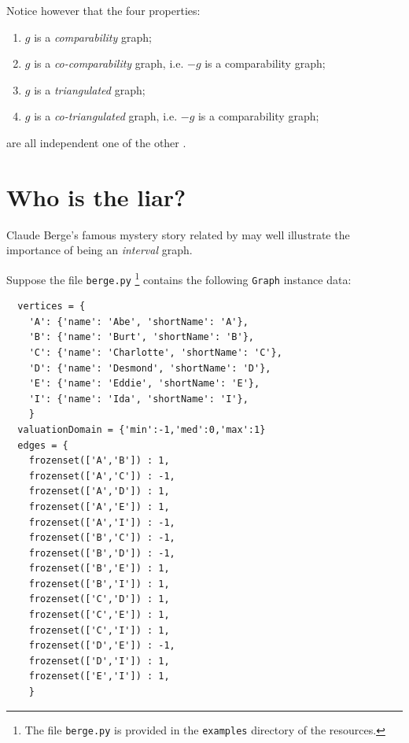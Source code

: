 Notice however that the four properties:
\begin{enumerate}[nosep]
\item $g$ is a \emph{comparability} graph;
\item $g$ is a \emph{co-comparability} graph, i.e. $-g$ is a comparability graph;
\item $g$ is a \emph{triangulated} graph;
\item $g$ is a \emph{co-triangulated} graph, i.e. $-g$ is a comparability graph;
\end{enumerate}
are all independent one of the other \citet[p. 275]{GOL-2004}.

\section{Who is the liar?}
\label{sec:23.2}

Claude Berge's famous mystery story related by \citet[p. 20]{GOL-2004} may well illustrate the importance of being an \emph{interval} graph.

Suppose the file \texttt{berge.py} \footnote{The file \texttt{berge.py} is provided in the \texttt{examples} directory of the \Digraph resources.} contains the following \texttt{Graph} instance data:
\begin{lstlisting}
  vertices = {
    'A': {'name': 'Abe', 'shortName': 'A'},
    'B': {'name': 'Burt', 'shortName': 'B'},
    'C': {'name': 'Charlotte', 'shortName': 'C'},
    'D': {'name': 'Desmond', 'shortName': 'D'},
    'E': {'name': 'Eddie', 'shortName': 'E'},
    'I': {'name': 'Ida', 'shortName': 'I'},
    }
  valuationDomain = {'min':-1,'med':0,'max':1}
  edges = {
    frozenset(['A','B']) : 1, 
    frozenset(['A','C']) : -1, 
    frozenset(['A','D']) : 1, 
    frozenset(['A','E']) : 1, 
    frozenset(['A','I']) : -1, 
    frozenset(['B','C']) : -1, 
    frozenset(['B','D']) : -1, 
    frozenset(['B','E']) : 1, 
    frozenset(['B','I']) : 1, 
    frozenset(['C','D']) : 1, 
    frozenset(['C','E']) : 1, 
    frozenset(['C','I']) : 1, 
    frozenset(['D','E']) : -1, 
    frozenset(['D','I']) : 1, 
    frozenset(['E','I']) : 1, 
    }
\end{lstlisting}

